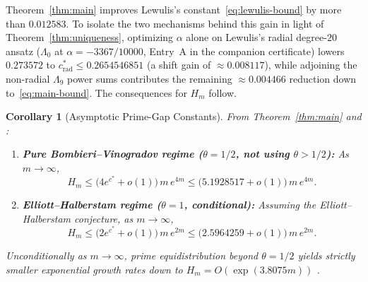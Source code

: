 \documentclass[11pt, reqno]{amsart}
\newtheorem{corollary}[theorem]{Corollary}
\theoremstyle{remark}
\numberwithin{equation}{section}
\begin{document}
Theorem~\ref{thm:main} improves Lewulis's constant~\eqref{eq:lewulis-bound} by more than
$0.012583$. To isolate the two mechanisms behind this gain
in light of Theorem~\ref{thm:uniqueness}, optimizing $\alpha$ alone on Lewulis's radial
degree-$20$ ansatz ($\Lambda_0$ at $\alpha = -3367/10000$, Entry~A in the companion certificate)
lowers $0.273572$ to $c_{\mathrm{rad}}^* \le 0.2654546851$ (a shift gain of $\approx 0.008117$),
while adjoining the non-radial $\Lambda_9$ power sums contributes the remaining
$\approx 0.004466$ reduction down to~\eqref{eq:main-bound}. The consequences for $H_m$ follow.

\begin{corollary}[Asymptotic Prime-Gap Constants]\label{cor:Hm}
From Theorem~\ref{thm:main} and \cite[Theorems~22 and~26]{PM8b}:
\begin{enumerate}
\item[(i)] \textbf{Pure Bombieri--Vinogradov regime ($\theta = 1/2$, not using $\theta > 1/2$):}
As $m \to \infty$,
\[
H_m \le \bigl(4 e^{c^*} + o(1)\bigr)\,m\,e^{4m} \le \bigl(5.1928517 + o(1)\bigr)\,m\,e^{4m}.
\]
\item[(ii)] \textbf{Elliott--Halberstam regime ($\theta = 1$, conditional):} Assuming the
Elliott--Halberstam conjecture, as $m \to \infty$,
\[
H_m \le \bigl(2 e^{c^*} + o(1)\bigr)\,m\,e^{2m} \le \bigl(2.5964259 + o(1)\bigr)\,m\,e^{2m}.
\]
\end{enumerate}
Unconditionally as $m \to \infty$, prime equidistribution beyond $\theta = 1/2$ \cite{PM8b, Stadlmann2025}
yields strictly smaller exponential growth rates down to $H_m = O(\exp(3.8075 m))$ \cite{Stadlmann2025}.
\end{corollary}
\end{document}
